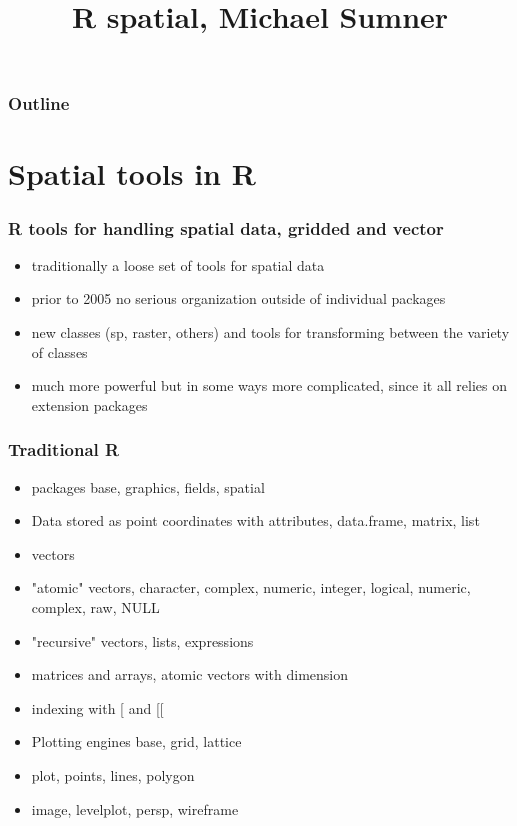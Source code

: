 \documentclass{beamer}\usepackage{graphicx, color}
\begin{document}
\title{R spatial, Michael Sumner}

\maketitle

\begin{frame}
\frametitle{Outline}
\tableofcontents
\end{frame}

\section{Spatial tools in R}
 \begin{frame}
  \frametitle{R tools for handling spatial data, gridded and vector}
 \begin{itemize} 
   \item traditionally a loose set of tools for spatial data
   \item prior to 2005 no serious organization outside of individual packages
   \item new classes (sp, raster, others) and tools for transforming between the variety of classes
   \item much more powerful but in some ways more complicated, since it all relies on extension packages
 \end{itemize} 
 \end{frame}

\begin{frame}
 \frametitle{Traditional R}
 \begin{itemize} 
   \item packages base, graphics, fields, spatial
   \item Data stored as point coordinates with attributes, data.frame, matrix, list
   \item vectors
   \item "atomic" vectors, character, complex, numeric, integer, logical, numeric, complex, raw, NULL
   \item "recursive" vectors, lists, expressions
   \item matrices and arrays, atomic vectors with dimension
   \item indexing with [ and [[
   \item Plotting engines base, grid, lattice
   \item plot, points, lines, polygon
   \item image, levelplot, persp, wireframe
 \end{itemize}
\end{frame}
\end{document}
